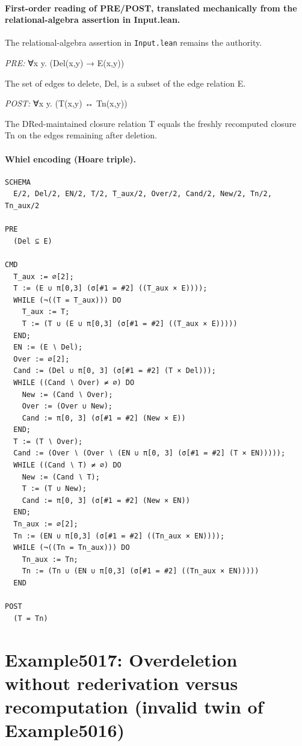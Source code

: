 \documentclass[10pt]{article}
\begin{document}
\paragraph{First-order reading of PRE/POST, translated mechanically from the relational-algebra assertion in Input.lean.} The relational-algebra assertion in \texttt{Input.lean} remains the authority.

\textit{PRE:} ∀x y. (Del(x,y) → E(x,y))\par The set of edges to delete, Del, is a subset of the edge relation E.

\textit{POST:} ∀x y. (T(x,y) ↔ Tn(x,y))\par The DRed-maintained closure relation T equals the freshly recomputed closure Tn on the edges remaining after deletion.

\paragraph{Whiel encoding (Hoare triple).}

\begin{Verbatim}[fontsize=\tiny,breaklines=true,breakanywhere=true,frame=single,framesep=1.5mm]
SCHEMA
  E/2, Del/2, EN/2, T/2, T_aux/2, Over/2, Cand/2, New/2, Tn/2, Tn_aux/2

PRE
  (Del ⊆ E) 

CMD
  T_aux := ∅[2];
  T := (E ∪ π[0,3] (σ[#1 = #2] ((T_aux × E))));
  WHILE (¬((T = T_aux))) DO
    T_aux := T;
    T := (T ∪ (E ∪ π[0,3] (σ[#1 = #2] ((T_aux × E)))))
  END;
  EN := (E ∖ Del);
  Over := ∅[2];
  Cand := (Del ∪ π[0, 3] (σ[#1 = #2] (T × Del)));
  WHILE ((Cand ∖ Over) ≠ ∅) DO
    New := (Cand ∖ Over);
    Over := (Over ∪ New);
    Cand := π[0, 3] (σ[#1 = #2] (New × E))
  END;
  T := (T ∖ Over);
  Cand := (Over ∖ (Over ∖ (EN ∪ π[0, 3] (σ[#1 = #2] (T × EN)))));
  WHILE ((Cand ∖ T) ≠ ∅) DO
    New := (Cand ∖ T);
    T := (T ∪ New);
    Cand := π[0, 3] (σ[#1 = #2] (New × EN))
  END;
  Tn_aux := ∅[2];
  Tn := (EN ∪ π[0,3] (σ[#1 = #2] ((Tn_aux × EN))));
  WHILE (¬((Tn = Tn_aux))) DO
    Tn_aux := Tn;
    Tn := (Tn ∪ (EN ∪ π[0,3] (σ[#1 = #2] ((Tn_aux × EN)))))
  END

POST
  (T = Tn)
\end{Verbatim}

\Needspace{0.45\textheight}

\section{Example5017: Overdeletion without rederivation versus recomputation (invalid twin of Example5016)}\label{case:Example5017}
\end{document}
